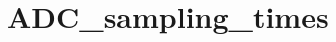 \hypertarget{group___a_d_c__sampling__times}{\section{A\-D\-C\-\_\-sampling\-\_\-times}
\label{group___a_d_c__sampling__times}
}
